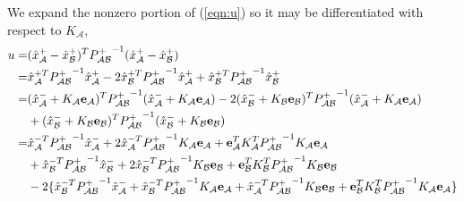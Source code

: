 \documentclass[10pt]{article}
\newcommand{\refeqn}[1]{(\ref{eqn:#1})}
\theoremstyle{plain}\theorembodyfont{\normalfont}
\begin{document}
%
We expand the nonzero portion of \refeqn{u} so it may be differentiated with respect to $K_\mathcal{A}$,
\begin{align}
\begin{split}
u=&(\hat x^+_\mathcal{A}-\hat x^+_\mathcal{B})^T{P^+_{\mathcal{A}\mathcal{B}}}^{-1}(\hat x^+_\mathcal{A}-\hat x^+_\mathcal{B})
\\
=&\hat x^{+T}_\mathcal{A}{P^+_{\mathcal{A}\mathcal{B}}}^{-1}\hat x^+_\mathcal{A}
-2\hat x^{+T}_\mathcal{B}{P^+_{\mathcal{A}\mathcal{B}}}^{-1}\hat x^+_\mathcal{A}
+\hat x^{+T}_\mathcal{B}{P^+_{\mathcal{A}\mathcal{B}}}^{-1}\hat x^+_\mathcal{B}
\\
=&(\hat x^-_\mathcal{A}+K_\mathcal{A}{\bf e}_\mathcal{A})^T{P^+_{\mathcal{A}\mathcal{B}}}^{-1}(\hat x^-_\mathcal{A}+K_\mathcal{A}{\bf e}_\mathcal{A})%
-2(\hat x^-_\mathcal{B}+K_\mathcal{B}{\bf e}_\mathcal{B})^T{P^+_{\mathcal{A}\mathcal{B}}}^{-1}(\hat x^-_\mathcal{A}+K_\mathcal{A}{\bf e}_\mathcal{A})
\\
&+(\hat x^-_\mathcal{B}+K_\mathcal{B}{\bf e}_\mathcal{B})^T{P^+_{\mathcal{A}\mathcal{B}}}^{-1}(\hat x^-_\mathcal{B}+K_\mathcal{B}{\bf e}_\mathcal{B})
\\
=&\hat x^{-T}_\mathcal{A}{P^+_{\mathcal{A}\mathcal{B}}}^{-1}\hat x^-_\mathcal{A}
+2\hat x^{-T}_\mathcal{A}{P^+_{\mathcal{A}\mathcal{B}}}^{-1}K_\mathcal{A}{\bf e}_\mathcal{A}
+{\bf e}_\mathcal{A}^TK_\mathcal{A}^T{P^+_{\mathcal{A}\mathcal{B}}}^{-1}K_\mathcal{A}{\bf e}_\mathcal{A}
\\
&+\hat x^{-T}_\mathcal{B}{P^+_{\mathcal{A}\mathcal{B}}}^{-1}\hat x^-_\mathcal{B}
+2\hat x^{-T}_\mathcal{B}{P^+_{\mathcal{A}\mathcal{B}}}^{-1}K_\mathcal{B}{\bf e}_\mathcal{B}
+{\bf e}_\mathcal{B}^TK_\mathcal{B}^T{P^+_{\mathcal{A}\mathcal{B}}}^{-1}K_\mathcal{B}{\bf e}_\mathcal{B}
\\
&-2\{\hat x^{-T}_\mathcal{B}{P^+_{\mathcal{A}\mathcal{B}}}^{-1}\hat x^-_\mathcal{A}
+\hat x^{-T}_\mathcal{B}{P^+_{\mathcal{A}\mathcal{B}}}^{-1}K_\mathcal{A}{\bf e}_\mathcal{A}
+\hat x^{-T}_\mathcal{A}{P^+_{\mathcal{A}\mathcal{B}}}^{-1}K_\mathcal{B}{\bf e}_\mathcal{B}
+{\bf e}_\mathcal{B}^TK_\mathcal{B}^T{P^+_{\mathcal{A}\mathcal{B}}}^{-1}K_\mathcal{A}{\bf e}_\mathcal{A}\}

\end{split}
\end{align}
\end{document}
